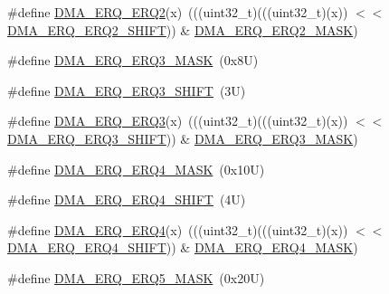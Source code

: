 \begin{DoxyCompactItemize}
\#define \mbox{\hyperlink{group___d_m_a___register___masks_ga0d78957bf7128fd79981dc13a2a83c29}{D\+M\+A\+\_\+\+E\+R\+Q\+\_\+\+E\+R\+Q2}}(x)~(((uint32\+\_\+t)(((uint32\+\_\+t)(x)) $<$$<$ \mbox{\hyperlink{group___d_m_a___register___masks_gac02628eae8fb2e01bd5703bb1ae5f7d5}{D\+M\+A\+\_\+\+E\+R\+Q\+\_\+\+E\+R\+Q2\+\_\+\+S\+H\+I\+FT}})) \& \mbox{\hyperlink{group___d_m_a___register___masks_gaa851ac71085a14b3d7db10f642f3254c}{D\+M\+A\+\_\+\+E\+R\+Q\+\_\+\+E\+R\+Q2\+\_\+\+M\+A\+SK}})
\item 
\#define \mbox{\hyperlink{group___d_m_a___register___masks_ga661adec66eab3b8f80f58a698dd96d34}{D\+M\+A\+\_\+\+E\+R\+Q\+\_\+\+E\+R\+Q3\+\_\+\+M\+A\+SK}}~(0x8\+U)
\item 
\#define \mbox{\hyperlink{group___d_m_a___register___masks_gadccb4f8d8991e9749b00991df83efafd}{D\+M\+A\+\_\+\+E\+R\+Q\+\_\+\+E\+R\+Q3\+\_\+\+S\+H\+I\+FT}}~(3\+U)
\item 
\#define \mbox{\hyperlink{group___d_m_a___register___masks_ga8ba6b06a0990416397d2a0095c40c6d4}{D\+M\+A\+\_\+\+E\+R\+Q\+\_\+\+E\+R\+Q3}}(x)~(((uint32\+\_\+t)(((uint32\+\_\+t)(x)) $<$$<$ \mbox{\hyperlink{group___d_m_a___register___masks_gadccb4f8d8991e9749b00991df83efafd}{D\+M\+A\+\_\+\+E\+R\+Q\+\_\+\+E\+R\+Q3\+\_\+\+S\+H\+I\+FT}})) \& \mbox{\hyperlink{group___d_m_a___register___masks_ga661adec66eab3b8f80f58a698dd96d34}{D\+M\+A\+\_\+\+E\+R\+Q\+\_\+\+E\+R\+Q3\+\_\+\+M\+A\+SK}})
\item 
\#define \mbox{\hyperlink{group___d_m_a___register___masks_ga3549bcb3fe0b2c916b5ea6353b89b386}{D\+M\+A\+\_\+\+E\+R\+Q\+\_\+\+E\+R\+Q4\+\_\+\+M\+A\+SK}}~(0x10\+U)
\item 
\#define \mbox{\hyperlink{group___d_m_a___register___masks_gaeb5940584a239a8931e7b3ff4a2d0539}{D\+M\+A\+\_\+\+E\+R\+Q\+\_\+\+E\+R\+Q4\+\_\+\+S\+H\+I\+FT}}~(4\+U)
\item 
\#define \mbox{\hyperlink{group___d_m_a___register___masks_ga97ef88b13f140e6acdc39bef0a892469}{D\+M\+A\+\_\+\+E\+R\+Q\+\_\+\+E\+R\+Q4}}(x)~(((uint32\+\_\+t)(((uint32\+\_\+t)(x)) $<$$<$ \mbox{\hyperlink{group___d_m_a___register___masks_gaeb5940584a239a8931e7b3ff4a2d0539}{D\+M\+A\+\_\+\+E\+R\+Q\+\_\+\+E\+R\+Q4\+\_\+\+S\+H\+I\+FT}})) \& \mbox{\hyperlink{group___d_m_a___register___masks_ga3549bcb3fe0b2c916b5ea6353b89b386}{D\+M\+A\+\_\+\+E\+R\+Q\+\_\+\+E\+R\+Q4\+\_\+\+M\+A\+SK}})
\item 
\#define \mbox{\hyperlink{group___d_m_a___register___masks_ga008e7d23e4eb7d513ba3ca1ae8754a92}{D\+M\+A\+\_\+\+E\+R\+Q\+\_\+\+E\+R\+Q5\+\_\+\+M\+A\+SK}}~(0x20\+U)
\item 
$$
\end{DoxyCompactItemize}
